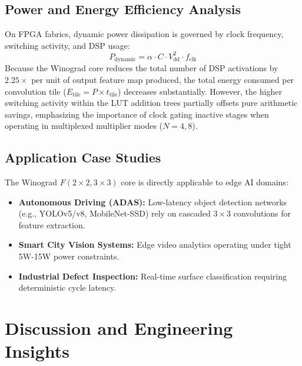 \documentclass[12pt,a4paper]{article}
\begin{document}
\subsection{Power and Energy Efficiency Analysis}
On FPGA fabrics, dynamic power dissipation is governed by clock frequency, switching activity, and DSP usage:
\begin{equation}
    P_{\text{dynamic}} = \alpha \cdot C \cdot V_{\text{dd}}^2 \cdot f_{\text{clk}}
\end{equation}
Because the Winograd core reduces the total number of DSP activations by $2.25\times$ per unit of output feature map produced, the total energy consumed per convolution tile ($E_{\text{tile}} = P \times t_{\text{tile}}$) decreases substantially. However, the higher switching activity within the LUT addition trees partially offsets pure arithmetic savings, emphasizing the importance of clock gating inactive stages when operating in multiplexed multiplier modes ($N=4, 8$).

\subsection{Application Case Studies}
The Winograd $F(2 \times 2, 3 \times 3)$ core is directly applicable to edge AI domains:
\begin{itemize}
    \item \textbf{Autonomous Driving (ADAS):} Low-latency object detection networks (e.g., YOLOv5/v8, MobileNet-SSD) rely on cascaded $3 \times 3$ convolutions for feature extraction.
    \item \textbf{Smart City Vision Systems:} Edge video analytics operating under tight 5W-15W power constraints.
    \item \textbf{Industrial Defect Inspection:} Real-time surface classification requiring deterministic cycle latency.
\end{itemize}

\section{Discussion and Engineering Insights}
\end{document}
